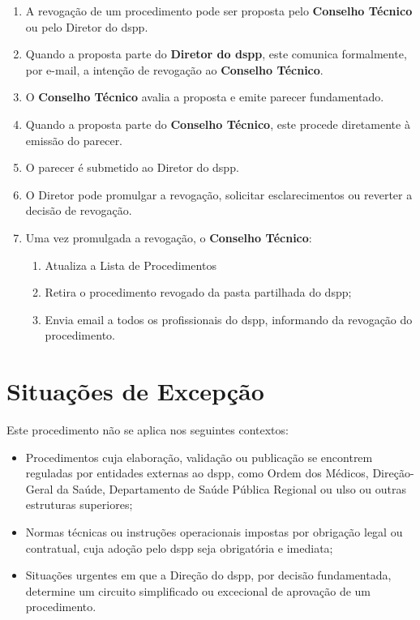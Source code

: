 \begin{enumerate}
  \item A revogação de um procedimento pode ser proposta pelo \textbf{Conselho Técnico} ou pelo Diretor do \gls{dspp}.
  \item Quando a proposta parte do \textbf{Diretor do \gls{dspp}}, este comunica formalmente, por e-mail, a intenção de revogação ao \textbf{Conselho Técnico}.
  \item O \textbf{Conselho Técnico} avalia a proposta e emite parecer fundamentado.
  \item Quando a proposta parte do \textbf{Conselho Técnico}, este procede diretamente à emissão do parecer.
  \item O parecer é submetido ao Diretor do \gls{dspp}.
  \item O Diretor pode promulgar a revogação, solicitar esclarecimentos ou reverter a decisão de revogação.
  \item Uma vez promulgada a revogação, o \textbf{Conselho Técnico}:
  \begin{enumerate}
    \item Atualiza a Lista de Procedimentos
    \item Retira o procedimento revogado da pasta partilhada do \gls{dspp};
    \item Envia email a todos os profissionais do \gls{dspp}, informando da revogação do procedimento.
  \end{enumerate}
\end{enumerate}



\section{Situações de Excepção}\label{sec:situacoes-de-excepcao}

Este procedimento não se aplica nos seguintes contextos:

\begin{itemize}
  \item Procedimentos cuja elaboração, validação ou publicação se encontrem reguladas por entidades externas ao \gls{dspp}, como Ordem dos Médicos, Direção-Geral da Saúde, Departamento de Saúde Pública Regional ou \gls{ulso} ou outras estruturas superiores;
  \item Normas técnicas ou instruções operacionais impostas por obrigação legal ou contratual, cuja adoção pelo \gls{dspp} seja obrigatória e imediata;
  \item Situações urgentes em que a Direção do \gls{dspp}, por decisão fundamentada, determine um circuito simplificado ou excecional de aprovação de um procedimento.
\end{itemize}


